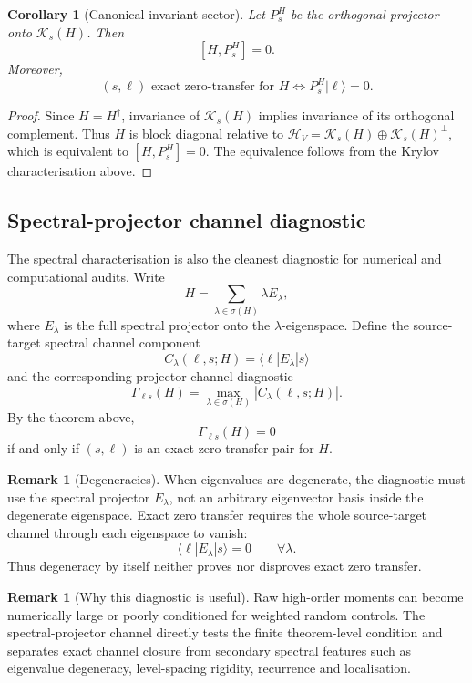 \documentclass[11pt]{article}
\newtheorem{corollary}[theorem]{Corollary}
\theoremstyle{definition}
\newtheorem{remark}[theorem]{Remark}
\newcommand{\cH}{\mathcal H}
\newcommand{\cK}{\mathcal K}
\begin{document}
\begin{corollary}[Canonical invariant sector]
Let $P^H_s$ be the orthogonal projector onto $\cK_s(H)$. Then
\[
[H,P^H_s]=0.
\]
Moreover,
\[
(s,\ell)\text{ exact zero-transfer for }H \Longleftrightarrow P^H_s|\ell\rangle=0.
\]
\end{corollary}

\begin{proof}
Since $H=H^\dagger$, invariance of $\cK_s(H)$ implies invariance of its orthogonal complement. Thus $H$ is block diagonal relative to $\cH_V=\cK_s(H)\oplus\cK_s(H)^\perp$, which is equivalent to $[H,P^H_s]=0$. The equivalence follows from the Krylov characterisation above.
\end{proof}


\subsection{Spectral-projector channel diagnostic}
The spectral characterisation is also the cleanest diagnostic for numerical and computational audits.  Write
\[
H=\sum_{\lambda\in\sigma(H)}\lambda E_\lambda,
\]
where $E_\lambda$ is the full spectral projector onto the $\lambda$-eigenspace.  Define the source-target spectral channel component
\[
C_\lambda(\ell,s;H)=\langle \ell|E_\lambda|s\rangle
\]
and the corresponding projector-channel diagnostic
\[
\Gamma_{\ell s}(H)=\max_{\lambda\in\sigma(H)} |C_\lambda(\ell,s;H)|.
\]
By the theorem above,
\[
\Gamma_{\ell s}(H)=0
\]
if and only if $(s,\ell)$ is an exact zero-transfer pair for $H$.

\begin{remark}[Degeneracies]
When eigenvalues are degenerate, the diagnostic must use the spectral projector $E_\lambda$, not an arbitrary eigenvector basis inside the degenerate eigenspace.  Exact zero transfer requires the whole source-target channel through each eigenspace to vanish:
\[
\langle \ell|E_\lambda|s\rangle=0\qquad \forall\lambda.
\]
Thus degeneracy by itself neither proves nor disproves exact zero transfer.
\end{remark}

\begin{remark}[Why this diagnostic is useful]
Raw high-order moments can become numerically large or poorly conditioned for weighted random controls.  The spectral-projector channel directly tests the finite theorem-level condition and separates exact channel closure from secondary spectral features such as eigenvalue degeneracy, level-spacing rigidity, recurrence and localisation.
\end{remark}
\end{document}
